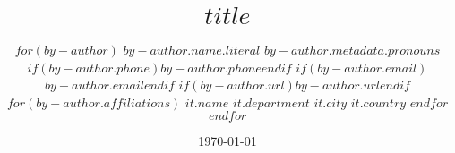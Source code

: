 \title{ \vspace{-1.5em}
\bf $title$ \vspace{-.5em}
}
\author{
  $for(by-author)$
    {$by-author.name.literal$ }
    \authorcr %
    $by-author.metadata.pronouns$
    \authorcr
    $if(by-author.phone)${$by-author.phone$}{}$endif$
    \authorcr
    $if(by-author.email)$\href{mailto:$by-author.email$}{$by-author.email$}$endif$
    \authorcr
    $if(by-author.url)$\href{$by-author.url$}{$by-author.url$}$endif$
    

    $for(by-author.affiliations)$
      $it.name$
      \authorcr
      $it.department$
      \authorcr
      $it.city$ $it.country$
    $endfor$
  $endfor$}

\date{\today}



